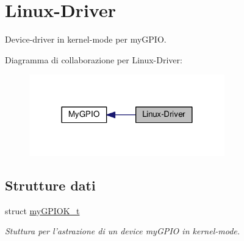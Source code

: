 \hypertarget{group___linux-_driver}{\section{Linux-\/\+Driver}
\label{group___linux-_driver}
}


Device-\/driver in kernel-\/mode per my\+G\+P\+I\+O.  


Diagramma di collaborazione per Linux-\/\+Driver\+:\nopagebreak
\begin{figure}[H]
\begin{center}
\leavevmode
\includegraphics[width=240pt]{group___linux-_driver}
\end{center}
\end{figure}
\subsection*{Strutture dati}
\begin{DoxyCompactItemize}
\item 
struct \hyperlink{structmy_g_p_i_o_k__t}{my\+G\+P\+I\+O\+K\+\_\+t}
\begin{DoxyCompactList}\small\item\em Stuttura per l'astrazione di un device my\+G\+P\+I\+O in kernel-\/mode. \end{DoxyCompactList}\end{DoxyCompactItemize}
